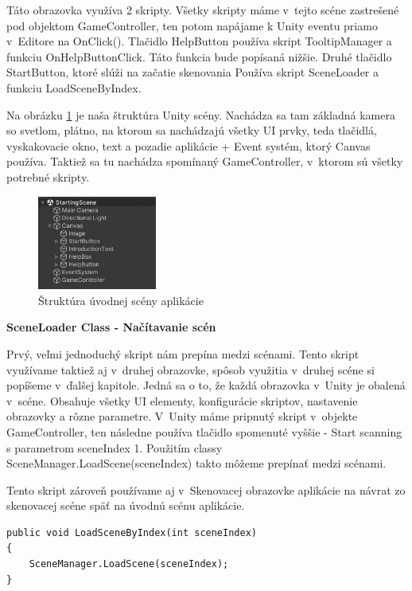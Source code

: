 
Táto obrazovka využíva 2 skripty. Všetky skripty máme v~tejto scéne zastrešené pod objektom GameController, ten potom napájame k Unity eventu priamo v~Editore na OnClick(). Tlačidlo HelpButton používa skript TooltipManager a funkciu OnHelpButtonClick. Táto funkcia bude popísaná nižšie. Druhé tlačidlo StartButton, ktoré slúži na začatie skenovania Používa skript SceneLoader a funkciu LoadSceneByIndex. 

Na obrázku \ref{fig:introductionSceneStructure} je naša štruktúra Unity scény. Nachádza sa tam základná kamera so svetlom, plátno, na ktorom sa nachádzajú všetky UI prvky, teda tlačidlá, vyskakovacie okno, text a pozadie aplikácie + Event systém, ktorý Canvas používa. Taktiež sa tu nachádza spomínaný GameController, v~ktorom sú všetky potrebné skripty.  

\begin{figure}[h]
  \centering
  \includegraphics[width=0.35\textwidth]{img/structure_introduction.png}
  \caption{Štruktúra úvodnej scény aplikácie}
  \label{fig:introductionSceneStructure}
\end{figure}

{\normalsize\textbf{SceneLoader Class - Načítavanie scén}}

Prvý, veľmi jednoduchý skript nám prepína medzi scénami. Tento skript využívame taktiež aj v~druhej obrazovke, spôsob využitia v~druhej scéne si popíšeme v~ďalšej kapitole. Jedná sa o to, že každá obrazovka v~Unity je obalená v~scéne. Obsahuje všetky UI elementy, konfigurácie skriptov, nastavenie obrazovky a rôzne parametre. V~Unity máme pripnutý skript v~objekte GameController, ten následne používa tlačidlo spomenuté vyššie - Start scanning s parametrom sceneIndex 1. Použitím classy SceneManager.LoadScene(sceneIndex) takto môžeme prepínať medzi scénami. %

Tento skript zároveň používame aj v~Skenovacej obrazovke aplikácie na návrat zo skenovacej scéne späť na úvodnú scénu aplikácie.

\lstset{style=Csharp}
\begin{lstlisting}[caption={SceneLoader Class - Načítavanie scén}, label=sceneLoader]
public void LoadSceneByIndex(int sceneIndex)
{
    SceneManager.LoadScene(sceneIndex);
}
\end{lstlisting}

